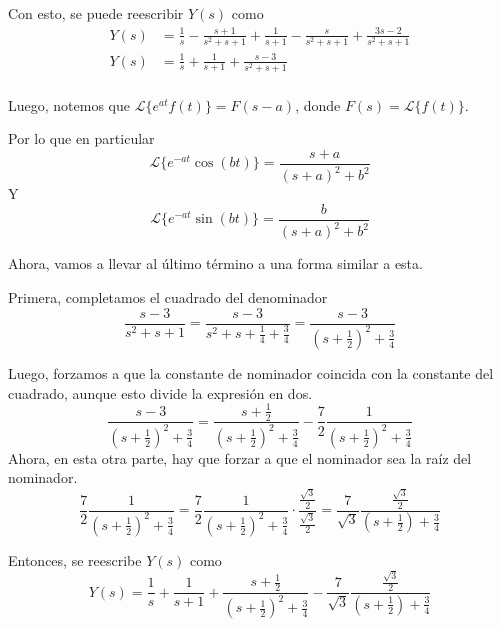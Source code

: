 \documentclass{article}
\begin{document}
\begin{enumerate}
{            Con esto, se puede reescribir $Y(s)$ como 
            \begin{align*}
                Y(s) &= \frac{1}{s} - \frac{s+1}{s^2+s+1} + \frac{1}{s+1} 
                - \frac{s}{s^2+s+1} + \frac{3s-2}{s^2+s+1} \\
                Y(s) &= \frac{1}{s} + \frac{1}{s+1} + \frac{s-3}{s^2+s+1} \\
            \end{align*}

            Luego, notemos que $\mathcal{L}\{e^{at}f(t)\} = F(s-a)$, 
            donde $F(s) = \mathcal{L}\{f(t)\}$.

            Por lo que en particular
            \[\mathcal{L}\{e^{-at}\cos(bt)\} = \frac{s+a}{(s+a)^2+b^2}\]
            Y 
            \[\mathcal{L}\{e^{-at}\sin(bt)\} = \frac{b}{(s+a)^2+b^2}\]


            Ahora, vamos a llevar al último término a una forma similar a esta.

            Primera, completamos el cuadrado del denominador
            \[
                \frac{s-3}{s^2+s+1} 
                = \frac{s-3}{s^2+s+\frac{1}{4} + \frac{3}{4}}
                = \frac{s-3}{(s+\frac{1}{2})^2+\frac{3}{4}}
            \]

            Luego, forzamos a que la constante de nominador coincida con la
            constante del cuadrado, aunque esto divide la expresión en dos.
            \[
                \frac{s-3}{(s+\frac{1}{2})^2+\frac{3}{4}} 
                = \frac{s+\frac{1}{2}}{(s+\frac{1}{2})^2+\frac{3}{4}}
                - \frac{7}{2}\frac{1}{(s+\frac{1}{2})^2+\frac{3}{4}}
            \]
            Ahora, en esta otra parte, hay que forzar a que el nominador sea la
            raíz del nominador.
            \[
                \frac{7}{2}\frac{1}{(s+\frac{1}{2})^2+\frac{3}{4}} 
                = \frac{7}{2} \frac{1}{(s+\frac{1}{2})^2+\frac{3}{4}}
                \cdot \frac{\frac{\sqrt{3}}{2}}{\frac{\sqrt{3}}{2}}
                = \frac{7}{\sqrt{3}}\frac{\frac{\sqrt{3}}{2}}{(s+\frac{1}{2})
                +\frac{3}{4}}
            \]
            
            Entonces, se reescribe $Y(s)$ como 
            \[
                Y(s) = \frac{1}{s} + \frac{1}{s+1}
                + \frac{s+\frac{1}{2}}{(s+\frac{1}{2})^2+\frac{3}{4}}
                -\frac{7}{\sqrt{3}}\frac{\frac{\sqrt{3}}{2}}{(s+\frac{1}{2})+\frac{3}{4}}
            \]

}
\end{enumerate}
\end{document}
